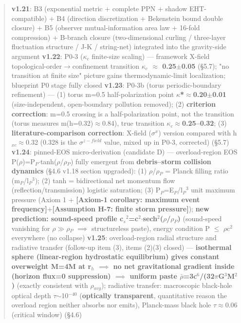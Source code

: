 \documentclass[12pt]{article}
\newcommand{\mtag}[1]{\textbf{[#1]}}
\newcommand{\up}[1]{\ensuremath{^{#1}}}
\newcommand{\down}[1]{\ensuremath{_{#1}}}
\begin{document}
\begin{quote}
\textbf{v1.21}: B3 (exponential metric + complete PPN + shadow EHT-compatible) + B4 (direction discretization + Bekenstein bound double closure) + B5 (observer mutual-information area law + 16-fold compression) + B-branch closure (two-dimensional curling / three-layer fluctuation structure / J-K / string-net) integrated into the gravity-side argument
\textbf{v1.22}: P0-3 (\ensuremath{\kappa}\down{c} finite-size scaling) --- framework X-field topological-order\ensuremath{\to}confinement transition \textbf{\ensuremath{\kappa}\down{c} \ensuremath{\approx} 0.25\ensuremath{\pm}0.05} (\S{}5.7); "no transition at finite size" picture gains thermodynamic-limit localization; blueprint P0 stage fully closed
\textbf{v1.23}: P0-3b (torus periodic-boundary refinement) --- (1) torus m=0.5 half-polarization point \textbf{\ensuremath{\kappa}*\ensuremath{\approx}0.20\ensuremath{\pm}0.01} (size-independent, open-boundary pollution removed); (2) \textbf{criterion correction}: m=0.5 crossing is a half-polarization point, not the transition (torus measures m(h=0.32)\ensuremath{\approx}0.84), true transition \textbf{\ensuremath{\kappa}\down{c}\ensuremath{\approx}0.25--0.32}; (3) \textbf{literature-comparison correction}: X-field (\ensuremath{\sigma}\up{x}) version compared with h\down{xc}\ensuremath{\approx}0.32 (0.328 is the \ensuremath{\sigma}\up{z-field} value, mixed up in P0-3, corrected) (\S{}5.7)
\textbf{v1.24}: pinned-EOS micro-derivation (candidate D) --- overload-region EOS P(\ensuremath{\rho})=P\down{P}\ensuremath{\cdot}tanh(\ensuremath{\rho}/\ensuremath{\rho}\down{P}) fully emergent from \textbf{debris--storm collision dynamics} (\S{}4.6 v1.18 section upgraded): (1) \ensuremath{\rho}/\ensuremath{\rho}\down{P} = Planck filling ratio (m\down{P}/l\down{P}\up{3}); (2) tanh = bidirectional net momentum flow (reflection/transmission) logistic saturation; (3) P\down{P}=E\down{P}/l\down{P}\up{3} unit maximum pressure (Axiom 1 + \mtag{Axiom-1 corollary: maximum event frequency}+\mtag{Assumption H-7: finite storm pressure}); \textbf{new prediction: sound-speed profile c\down{s}\up{2}=c\up{2}\ensuremath{\cdot}sech\up{2}(\ensuremath{\rho}/\ensuremath{\rho}\down{P})} (sound-speed vanishing for \ensuremath{\rho}\ensuremath{\gg}\ensuremath{\rho}\down{P} \ensuremath{\implies} structureless paste), energy condition P \ensuremath{\leq} \ensuremath{\rho}c\up{2} everywhere (no collapse)
\textbf{v1.25}: overload-region radial structure and radiative transfer (follow-up item (3), items (2)(3) closed) --- \textbf{isothermal sphere (linear-region hydrostatic equilibrium) gives constant overweight M=4M at r\down{h} \ensuremath{\implies} no net gravitational gradient inside (horizon flux=0 suppression) \ensuremath{\implies} uniform paste \ensuremath{\bar{\rho}}=3c\up{6}/(32\ensuremath{\pi}G\up{3}M\up{2})} (exactly consistent with \ensuremath{\rho}\down{avg}); radiative transfer: macroscopic black-hole optical depth \ensuremath{\tau}\ensuremath{\sim}10\up{-40} (\textbf{optically transparent}, quantitative reason the overload region neither absorbs nor emits), Planck-mass black hole \ensuremath{\tau}\ensuremath{\approx}0.06 (critical window) (\S{}4.6)

\end{quote}
\end{document}
